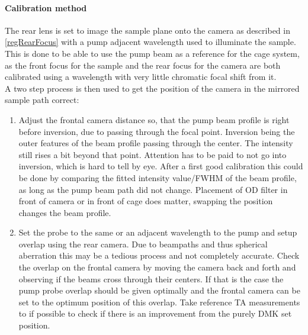 \documentclass[twoside,openright]{scrreprt}
\begin{document}
\paragraph{Calibration method}
The rear lens is set to image the sample plane onto the camera as described in \ref{regRearFocus} with a pump adjacent wavelength used to illuminate the sample. This is done to be able to use the pump beam as a reference for the cage system, as the front focus for the sample and the rear focus for the camera are both calibrated using a wavelength with very little chromatic focal shift from it.\\
A two step process is then used to get the position of the camera in the mirrored sample path correct:
\begin{enumerate}
\item Adjust the frontal camera distance so, that the pump beam profile is right before inversion, due to passing through the focal point. Inversion being the outer features of the beam profile passing through the center. The intensity still rises a bit beyond that point. Attention has to be paid to not go into inversion, which is hard to tell by eye. After a first good calibration this could be done by comparing the fitted intensity value/FWHM of the beam profile, as long as the pump beam path did not change. Placement of OD filter in front of camera or in front of cage does matter, swapping the position changes the beam profile.
\item Set the probe to the same or an adjacent wavelength to the pump and setup overlap using the rear camera. Due to beampaths and thus spherical aberration this may be a tedious process and not completely accurate. Check the overlap on the frontal camera by moving the camera back and forth and observing if the beams cross through their centers. If that is the case the pump probe overlap should be given optimally and the frontal camera can be set to the optimum position of this overlap. Take reference TA measurements to if possible to check if there is an improvement from the purely DMK set position.
\end{enumerate}
\end{document}

